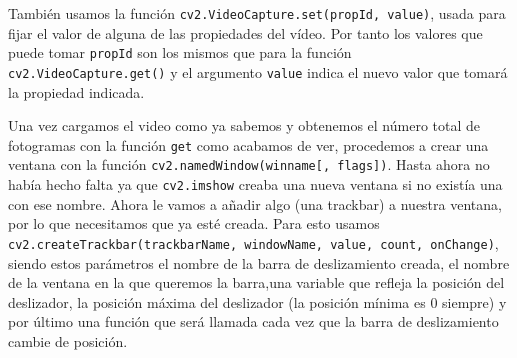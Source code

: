 \documentclass[a4paper,openright, 12pt]{book}
\begin{document}
También usamos la función \lstinline|cv2.VideoCapture.set(propId, value)|, usada para fijar el valor de alguna de las propiedades del vídeo. Por tanto los valores que puede tomar \lstinline|propId| son los mismos que para la función \lstinline|cv2.VideoCapture.get()| y el argumento \lstinline|value| indica el nuevo valor que tomará la propiedad indicada.

Una vez cargamos el video como ya sabemos y obtenemos el número total de fotogramas con la función \lstinline|get| como acabamos de ver, procedemos a crear una ventana con la función \lstinline|cv2.namedWindow(winname[, flags])|.
Hasta ahora no había hecho falta ya que \lstinline|cv2.imshow| creaba una nueva ventana si no existía una con ese nombre.
Ahora le vamos a añadir algo (una trackbar) a nuestra ventana, por lo que necesitamos que ya esté creada.
Para esto usamos \lstinline|cv2.createTrackbar(trackbarName, windowName, value, count, onChange)|, siendo estos parámetros el nombre de la barra de deslizamiento creada, el nombre de la ventana en la que queremos la barra,una variable que refleja la posición del deslizador, la posición máxima del deslizador (la posición mínima es 0 siempre) y por último una función que será llamada cada vez que la barra de deslizamiento cambie de posición.

\newpage
\end{document}
